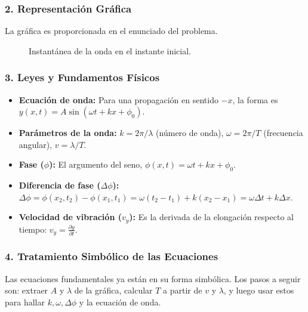 \subsubsection*{2. Representación Gráfica}
La gráfica es proporcionada en el enunciado del problema.
\begin{figure}[H]
    \centering
    \caption{Instantánea de la onda en el instante inicial.}
\end{figure}

\subsubsection*{3. Leyes y Fundamentos Físicos}
\begin{itemize}
    \item \textbf{Ecuación de onda:} Para una propagación en sentido $-x$, la forma es $y(x,t) = A\sin(\omega t + kx + \phi_0)$.
    \item \textbf{Parámetros de la onda:} $k = 2\pi/\lambda$ (número de onda), $\omega = 2\pi/T$ (frecuencia angular), $v = \lambda/T$.
    \item \textbf{Fase ($\phi$):} El argumento del seno, $\phi(x,t) = \omega t + kx + \phi_0$.
    \item \textbf{Diferencia de fase ($\Delta\phi$):} $\Delta\phi = \phi(x_2, t_2) - \phi(x_1, t_1) = \omega(t_2-t_1) + k(x_2-x_1) = \omega\Delta t + k\Delta x$.
    \item \textbf{Velocidad de vibración ($v_y$):} Es la derivada de la elongación respecto al tiempo: $v_y = \frac{\partial y}{\partial t}$.
\end{itemize}

\subsubsection*{4. Tratamiento Simbólico de las Ecuaciones}
Las ecuaciones fundamentales ya están en su forma simbólica. Los pasos a seguir son: extraer $A$ y $\lambda$ de la gráfica, calcular $T$ a partir de $v$ y $\lambda$, y luego usar estos para hallar $k, \omega, \Delta\phi$ y la ecuación de onda.

